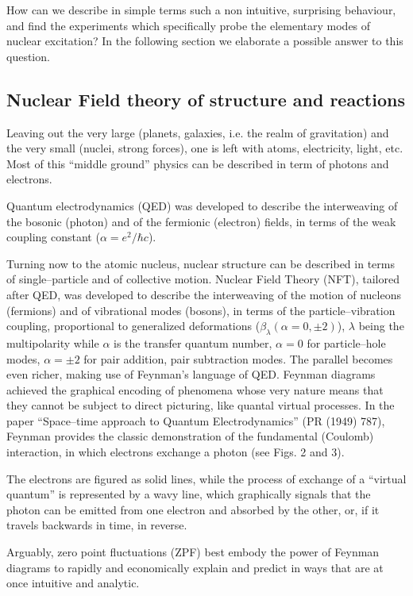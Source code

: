 \documentclass[a4paper,onecolumn,superscriptaddress,12pt,nofootinbib,twoside,raggedfooter,notitlepage]{revtex4-1}
\begin{document}
How can we describe in simple terms such a non intuitive, surprising behaviour, and find the experiments which specifically probe the elementary modes of nuclear excitation? In the following section we elaborate a possible answer to this question.

\pagebreak

\subsection{Nuclear Field theory of structure and reactions}

Leaving out the very large (planets, galaxies, i.e. the realm of gravitation) and the very small (nuclei, strong forces), one is left with atoms, electricity, light, etc. Most of this ``middle ground'' physics can be described in term of photons and electrons.

Quantum electrodynamics (QED) was developed to describe the interweaving of the bosonic (photon) and of the fermionic (electron) fields, in terms of the weak coupling constant ($\alpha = e^2/ \hbar c$).

Turning now to the atomic nucleus, nuclear structure can be described in terms of single--particle and of collective motion. Nuclear Field Theory (NFT), tailored after QED, was developed to describe the interweaving of the motion of nucleons (fermions) and of vibrational modes (bosons), in terms of the particle--vibration coupling, proportional to generalized deformations ($\beta_\lambda (\alpha=0, \pm 2)$), $\lambda$ being the multipolarity while $\alpha$ is the transfer quantum number, $\alpha=0$ for particle--hole modes, $\alpha=\pm 2$ for pair addition, pair subtraction modes. The parallel becomes even richer, making use of Feynman's language of QED. Feynman diagrams achieved the graphical encoding of phenomena whose very nature means that they cannot be subject to direct picturing, like quantal virtual processes. In the paper ``Space--time approach to Quantum Electrodynamics'' (PR (1949) 787), Feynman provides the classic demonstration of the fundamental (Coulomb) interaction, in which electrons exchange a photon (see Figs. 2 and 3).

The electrons are figured as solid lines, while the process of exchange of a ``virtual quantum'' is represented by a wavy line, which graphically signals that the photon can be emitted from one electron and absorbed by the other, or, if it travels backwards in time, in reverse.

Arguably, zero point fluctuations (ZPF) best embody the power of Feynman diagrams to rapidly and economically explain and predict in ways that are at once intuitive and analytic.
\end{document}
